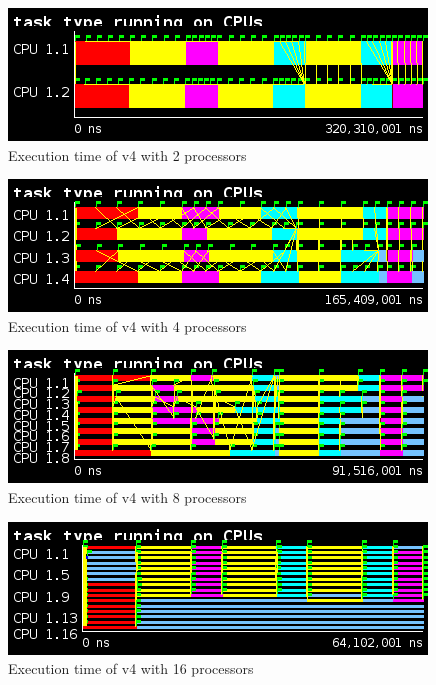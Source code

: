 \begin{figure}[H]%
    \caption{Execution time of v4 with 2 processors}%
    \label{fig:plot_v4_02}
    \centering
    \includegraphics[width=\textwidth]{./data/3dfft_/plots/v4_02.png}
\end{figure}

\begin{figure}[H]%
    \caption{Execution time of v4 with 4 processors}%
    \label{fig:plot_v4_04}
    \centering
    \includegraphics[width=\textwidth]{./data/3dfft_/plots/v4_04.png}
\end{figure}

\begin{figure}[H]%
    \caption{Execution time of v4 with 8 processors}%
    \label{fig:plot_v4_08}
    \centering
    \includegraphics[width=\textwidth]{./data/3dfft_/plots/v4_08.png}
\end{figure}

\begin{figure}[H]%
    \caption{Execution time of v4 with 16 processors}%
    \label{fig:plot_v4_16}
    \centering
    \includegraphics[width=\textwidth]{./data/3dfft_/plots/v4_16.png}
\end{figure}


